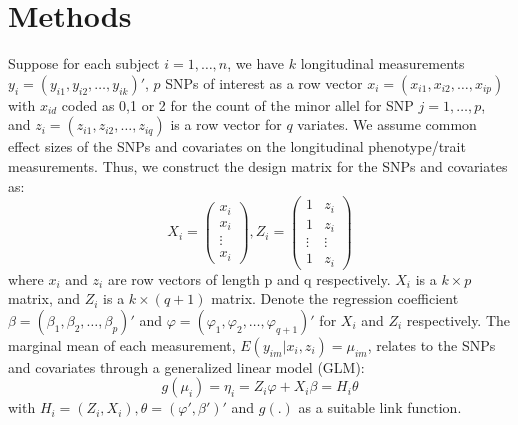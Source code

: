 \documentclass[12pt]{article}
\begin{document}
\section{Methods}
Suppose for each subject $i = 1,\ldots,n$, we have $k$ longitudinal measurements $y_i = (y_{i1}, y_{i2}, \ldots, y_{ik})'$, $p$ SNPs of interest as a row vector $x_i = (x_{i1}, x_{i2}, \ldots, x_{ip})$ with $x_{id}$ coded as 0,1 or 2 for the count of the minor allel for SNP $j = 1, \ldots, p$, and $z_i = (z_{i1}, z_{i2}, \ldots, z_{iq})$ is a row vector for $q$ variates. We assume common effect sizes of the SNPs and covariates on the longitudinal phenotype/trait measurements. Thus, we construct the design matrix for the SNPs and covariates as:\\
$$
  X_i = \begin{pmatrix}
          x_{i}\\
          x_{i}\\
          \vdots\\
          x_{i}
          \end{pmatrix} 
  , 
  Z_{i}=\begin{pmatrix}1 & z_{i}\\
          1 & z_{i}\\
          \vdots & \vdots\\
          1 & z_{i}
          \end{pmatrix}
$$
where $x_i$ and $z_i$ are row vectors of length p and q respectively. $X_i$ is a $k \times p$ matrix, and $Z_{i}$ is a $k \times (q+1)$ matrix. Denote the regression coefficient $\beta = (\beta_1, \beta_2, \ldots, \beta_p)'$ and $\varphi = (\varphi_1, \varphi_2, \ldots, \varphi_{q+1})'$ for $X_i$ and $Z_i$ respectively. The marginal mean of each measurement, $E(y_{im}|x_i,z_i) = \mu_{im}$, relates to the SNPs and covariates through a generalized linear model (GLM):
$$
g(\mu_i) = \eta_i = Z_i \varphi + X_i \beta = H_i \theta
$$
\noindent with $H_i = (Z_i, X_i), \theta = (\varphi', \beta')'$ and $g(.)$ as a suitable link function.
\end{document}
